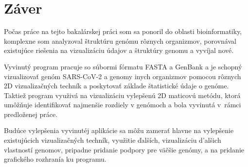 
\chapter{Záver}
\label{summary}

Počas práce na tejto bakalárskej práci som sa ponoril do oblasti bioinformatiky, komplexne som analyzoval štruktúru genómu rôznych organizmov, porovnával existujúce riešenia na vizualizáciu údajov a štruktúry genomu a vyvíjal nové.

Vyvinutý program pracuje so súbormi fórmatu FASTA a GenBank a je schopný vizualizovať genóm SARS-CoV-2 a genomy inych organizmov pomocou rôznych 2D vizualizačných techník a poskytovať základe štatistické údaje o genóme.
Taktiež program využivá na vizualizáciu vylepšenú 2D maticovú metódu, ktorá umôžňuje identifikovať najmenšie rozdiely v genómoch a bola vyvinutá v rámci predloženej práce.

Budúce vylepšenia vyvinutéj aplikácie sa môžu zamerať hlavne na vylepšenie existujúcich vizualizačných techník, využitie ďalších, vizualizáciu d'alšich vlastností genomov, pripadne pridanie podpory pre väčšie genómy, a na pridanie grafického rozhranía ku programu.